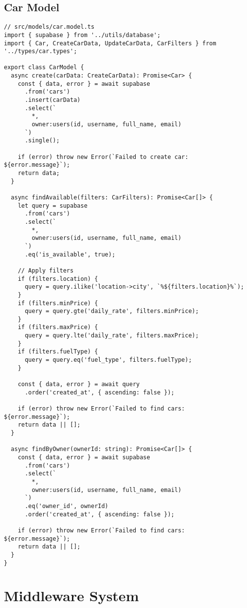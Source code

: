 \documentclass[12pt,a4paper]{article}
\begin{document}
\subsection{Car Model}
\begin{lstlisting}[caption=Car Data Access Model]
// src/models/car.model.ts
import { supabase } from '../utils/database';
import { Car, CreateCarData, UpdateCarData, CarFilters } from '../types/car.types';

export class CarModel {
  async create(carData: CreateCarData): Promise<Car> {
    const { data, error } = await supabase
      .from('cars')
      .insert(carData)
      .select(`
        *,
        owner:users(id, username, full_name, email)
      `)
      .single();

    if (error) throw new Error(`Failed to create car: ${error.message}`);
    return data;
  }

  async findAvailable(filters: CarFilters): Promise<Car[]> {
    let query = supabase
      .from('cars')
      .select(`
        *,
        owner:users(id, username, full_name, email)
      `)
      .eq('is_available', true);

    // Apply filters
    if (filters.location) {
      query = query.ilike('location->city', `%${filters.location}%`);
    }
    if (filters.minPrice) {
      query = query.gte('daily_rate', filters.minPrice);
    }
    if (filters.maxPrice) {
      query = query.lte('daily_rate', filters.maxPrice);
    }
    if (filters.fuelType) {
      query = query.eq('fuel_type', filters.fuelType);
    }

    const { data, error } = await query
      .order('created_at', { ascending: false });

    if (error) throw new Error(`Failed to find cars: ${error.message}`);
    return data || [];
  }

  async findByOwner(ownerId: string): Promise<Car[]> {
    const { data, error } = await supabase
      .from('cars')
      .select(`
        *,
        owner:users(id, username, full_name, email)
      `)
      .eq('owner_id', ownerId)
      .order('created_at', { ascending: false });

    if (error) throw new Error(`Failed to find cars: ${error.message}`);
    return data || [];
  }
}
\end{lstlisting}

\section{Middleware System}
\end{document}
